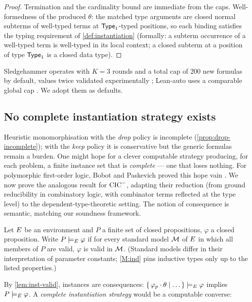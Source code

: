 \begin{proof}
Termination and the cardinality bound are immediate from the caps.
Well-formedness of the produced $\theta$: the matched type arguments
are closed normal subterms of well-typed terms at $\mathsf{Type}_1$-typed
positions, so each binding satisfies the typing requirement of
\cref{def:instantiation} (formally: a subterm occurrence of a
well-typed term is well-typed in its local context; a closed subterm
at a position of type $\mathsf{Type}_1$ is a closed data type).
\end{proof}

Sledgehammer operates with $K = 3$ rounds and a total cap of $200$
new formulas by default, values twice validated experimentally
\cite{Blanchette2016,Desharnais2022}; Lean-auto uses a comparable
global cap \cite{QianEtAl2025}.  We adopt them as defaults.

\subsection{No complete instantiation strategy exists}
\label{sec:undecidability}

Heuristic monomorphisation with the \emph{drop} policy is
incomplete (\cref{prop:drop-incomplete}); with the \emph{keep}
policy it is conservative but the generic formulas remain a burden.
One might hope for a clever computable strategy producing, for each
problem, a finite instance set that is \emph{complete} --- one that
loses nothing.  For polymorphic first-order logic,
Bobot and Paskevich proved this hope vain
\cite[Thm.~1]{BobotPaskevich2011}.  We now prove the analogous
result for $\mathrm{CIC}^{-}$, adapting their reduction (from ground
reducibility in combinatory logic, with combinator terms reflected
at the type level) to the dependent-type-theoretic setting.  The
notion of consequence is semantic, matching our soundness
framework.

\begin{definition}[Consequence]
\label{def:consequence}
Let $E$ be an environment and $P$ a finite set of closed
propositions, $\varphi$ a closed proposition.  Write $P
\models_{E} \varphi$ if for every standard model $\mathcal{M}$ of
$E$ in which all members of $P$ are valid, $\varphi$ is valid in
$\mathcal{M}$.  (Standard models differ in their interpretation of
parameter constants; \ref{M:ind} pins inductive types only up to
the listed properties.)
\end{definition}

By \cref{lem:inst-valid}, instances are consequences:
$\{\,\varphi_p \cdot \theta \mid \ldots\,\} \models_{E} \varphi$
implies $P \models_{E} \varphi$.  A \emph{complete instantiation
strategy} would be a computable converse:

